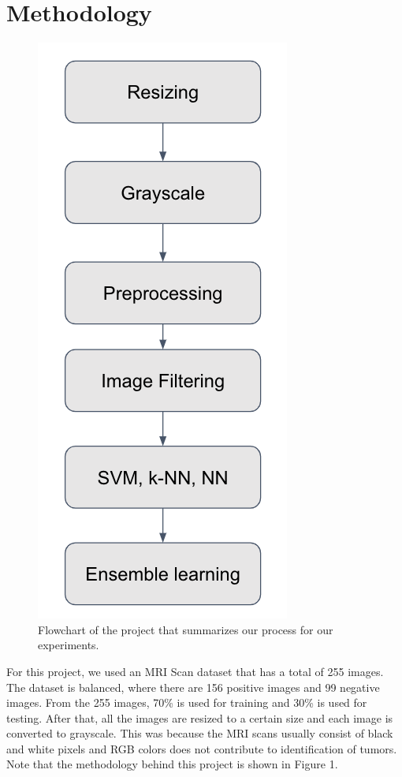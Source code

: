 \documentclass[conference]{IEEEtran}
\begin{document}
\section{Methodology}\label{method}
\begin{figure}[h]
\centering
\includegraphics[scale=0.4]{flowchart}
\caption{Flowchart of the project that summarizes our process for our experiments.}
\end{figure}

For this project, we used an MRI Scan dataset that has a total of 255 images. The dataset is balanced, where there are 156 positive images and 99 negative images. From the 255 images, 70\% is used for training and 30\% is used for testing. After that, all the images are resized to a certain size and each image is converted to grayscale. This was because the MRI scans usually consist of black and white pixels and RGB colors does not contribute to identification of tumors. Note that the methodology behind this project is shown in Figure 1.
\end{document}
